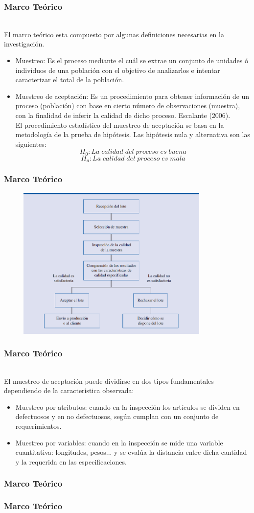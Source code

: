 \documentclass[11pt]{beamer}
\begin{document}
\begin{frame}
\frametitle{Marco Teórico}
~\\El marco teórico esta compuesto por algunas definiciones necesarias en la investigación.
\begin{itemize}
\item Muestreo: Es el proceso mediante el cuál se extrae un conjunto de unidades ó individuos de una población con el objetivo de analizarlos e intentar caracterizar el total de la población.
\item Muestreo de aceptación: Es un procedimiento para obtener información de un proceso (población) con base en cierto número de observaciones (muestra), con la finalidad de inferir la calidad de dicho proceso. Escalante (2006).
~\\El procedimiento estadístico del muestreo de aceptación se basa en la metodología de la prueba de hipótesis. Las hipótesis nula y alternativa son las siguientes:
$$H_0:La \; calidad \; del \; proceso \; es \; buena$$
$$H_a:La \; calidad \; del \; proceso \; es \; mala$$
\end{itemize}
\end{frame}


\begin{frame}
\frametitle{Marco Teórico}
\begin{figure}[!h]
        \includegraphics[width=9.5cm]{IMAGENES/MA.png}
        \label{figura1}
\end{figure}
\end{frame}

\begin{frame}
\frametitle{Marco Teórico}
~\\El muestreo de aceptación puede dividirse en dos tipos fundamentales dependiendo de la característica observada:
\begin{itemize}
\item Muestreo por atributos: cuando en la inspección los artículos se dividen en defectuosos y en no defectuosos, según cumplan con un conjunto de requerimientos.
\item Muestreo por variables: cuando en la inspección se mide una variable cuantitativa: longitudes, pesos... y se evalúa la distancia entre dicha cantidad y la requerida en las especificaciones.
\end{itemize}
\end{frame}

\begin{frame}
\frametitle{Marco Teórico}

\end{frame}

\begin{frame}
\frametitle{Marco Teórico}

\end{frame}
\end{document}
